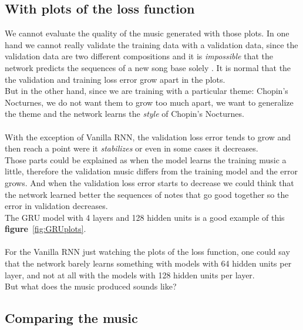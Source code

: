 \documentclass[11pt]
{article}
\begin{document}
\subsection{With plots of the loss function}
We cannot evaluate the quality of the music generated with those plots.
In one hand we cannot really validate the training data with a validation data, since the validation data are two different compositions and it is \textit{impossible} that the network predicts the sequences of a new song base solely .
It is normal that the the validation and training loss error grow apart in the plots.\\
But in the other hand, since we are training with a particular theme: Chopin's Nocturnes, we do not want them to grow too much apart, we want to generalize the theme and the network learns the \textit{style} of Chopin's Nocturnes.\\
\\

With the exception of Vanilla RNN, the validation loss error tends to grow and then reach a point were it \textit{stabilizes} or even in some cases it decreases.\\
Those parts could be explained as when the model learns the training music a little, therefore the validation music differs from the training model and the error grows.
And when the validation loss error starts to decrease we could think that the network learned better the sequences of notes that go good together so the error in validation decreases.\\
The GRU model with 4 layers and 128 hidden units is a good example of this \textbf{figure}~\ref{fig:GRUplots}.\\
\\
For the Vanilla RNN just watching the plots of the loss function, one could say that the network barely learns something with models with 64 hidden units per layer, and not at all with the models with 128 hidden units per layer.\\
But what does the music produced sounds like?







\subsection{Comparing the music}
\end{document}
